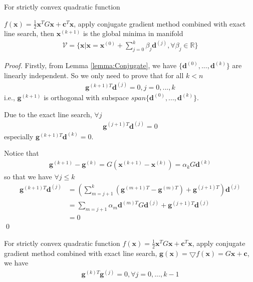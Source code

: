 \documentclass[runningheads]{llncs}
\begin{document}
\begin{theorem}
    For strictly convex quadratic function 
    \par\noindent
    $f(\mathbf{x}) = \frac{1}{2} \mathbf{x}^T G \mathbf{x} + \mathbf{c}^T\mathbf{x}$,
    apply conjugate gradient method combined with exact line search,
    then $\mathbf{x}^{(k+1)}$ is the global minima in manifold
    \begin{align}
        \mathcal{V} =  \{ \mathbf{x} | \mathbf{x} = \mathbf{x}^{(0)} + 
        \sum_{j=0}^k\beta_j\mathbf{d}^{(j)}, \forall \beta_j \in \mathbb{R} \}
    \end{align}
    \label{th:Conjugate}
\end{theorem}
\begin{proof}
    Firstly, from Lemma \ref{lemma:Conjugate}, we have 
    $\{ \mathbf{d}^{(0)}, ...,\mathbf{d}^{(k)}\}$ are linearly independent.
    So we only need to prove that 
    for all $k < n$
    \begin{align}
        \mathbf{g}^{(k+1)T}\mathbf{d}^{(j)} = 0, j = 0,..., k
    \end{align}
    i.e., $\mathbf{g}^{(k+1)}$ is orthogonal with subspace
    $span\{\mathbf{d}^{(0)}, ...,\mathbf{d}^{(k)}\}$.
    \par
    Due to the exact line search, $\forall j$
    \begin{align}
        \mathbf{g}^{(j+1)T}\mathbf{d}^{(j)} = 0
    \end{align}
    especially $\mathbf{g}^{(k+1)T}\mathbf{d}^{(k)} = 0$.
    \par
    Notice that 
    \begin{align}
        \mathbf{g}^{(k+1)} - \mathbf{g}^{(k)}
        = G (\mathbf{x}^{(k+1)} - \mathbf{x}^{(k)})
        = \alpha_k G \mathbf{d}^{(k)}
    \end{align}
    so that we have $\forall j \leq k$
    \begin{align}
        \mathbf{g}^{(k+1)T}\mathbf{d}^{(j)}
        &= (\sum_{m=j+1}^k (\mathbf{g}^{(m+1)T} - \mathbf{g}^{(m)T})
        + \mathbf{g}^{(j+1)T} )\mathbf{d}^{(j)} \\
        &= \sum_{m=j+1} \alpha_m \mathbf{d}^{(m)T}G \mathbf{d}^{(j)}
        + \mathbf{g}^{(j+1)T} \mathbf{d}^{(j)} \\
        &= 0
    \end{align}
    \qed
\end{proof}
\begin{lemma}
    For strictly convex quadratic function 
    $f(\mathbf{x}) = \frac{1}{2} \mathbf{x}^T G \mathbf{x} + \mathbf{c}^T\mathbf{x}$,
    apply conjugate gradient method combined with exact line search,
    $\mathbf{g}(\mathbf{x}) = \bigtriangledown f(\mathbf{x}) = G\mathbf{x} + \mathbf{c}$,
    we have
    \begin{align}
        \mathbf{g}^{(k)T}\mathbf{g}^{(j)} = 0, \forall j = 0,..., k-1
    \end{align}
    \label{lemma:Conjugate}
\end{lemma}
\end{document}
